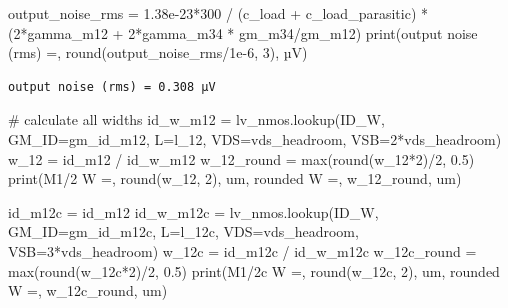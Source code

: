 \documentclass[
  a4paper,
  DIV=11,
  numbers=noendperiod]{scrartcl}
\newenvironment{Shaded}{\begin{snugshade}}{\end{snugshade}}
\newcommand{\BuiltInTok}[1]{\textcolor[rgb]{0.00,0.23,0.31}{#1}}
\newcommand{\CommentTok}[1]{\textcolor[rgb]{0.37,0.37,0.37}{#1}}
\newcommand{\DecValTok}[1]{\textcolor[rgb]{0.68,0.00,0.00}{#1}}
\newcommand{\FloatTok}[1]{\textcolor[rgb]{0.68,0.00,0.00}{#1}}
\newcommand{\NormalTok}[1]{\textcolor[rgb]{0.00,0.23,0.31}{#1}}
\newcommand{\OperatorTok}[1]{\textcolor[rgb]{0.37,0.37,0.37}{#1}}
\newcommand{\StringTok}[1]{\textcolor[rgb]{0.13,0.47,0.30}{#1}}
\begin{document}
\begin{tcolorbox}
\begin{Shaded}
\begin{Highlighting}[]
\NormalTok{output\_noise\_rms }\OperatorTok{=} \FloatTok{1.38e{-}23}\OperatorTok{*}\DecValTok{300} \OperatorTok{/}\NormalTok{ (c\_load }\OperatorTok{+}\NormalTok{ c\_load\_parasitic) }\OperatorTok{*}\NormalTok{ (}\DecValTok{2}\OperatorTok{*}\NormalTok{gamma\_m12 }\OperatorTok{+} \DecValTok{2}\OperatorTok{*}\NormalTok{gamma\_m34 }\OperatorTok{*}\NormalTok{ gm\_m34}\OperatorTok{/}\NormalTok{gm\_m12)}
\BuiltInTok{print}\NormalTok{(}\StringTok{\textquotesingle{}output noise (rms) =\textquotesingle{}}\NormalTok{, }\BuiltInTok{round}\NormalTok{(output\_noise\_rms}\OperatorTok{/}\FloatTok{1e{-}6}\NormalTok{, }\DecValTok{3}\NormalTok{), }\StringTok{\textquotesingle{}µV\textquotesingle{}}\NormalTok{)}
\end{Highlighting}
\end{Shaded}

\begin{verbatim}
output noise (rms) = 0.308 µV
\end{verbatim}

\begin{Shaded}
\begin{Highlighting}[]
\CommentTok{\# calculate all widths}
\NormalTok{id\_w\_m12 }\OperatorTok{=}\NormalTok{ lv\_nmos.lookup(}\StringTok{\textquotesingle{}ID\_W\textquotesingle{}}\NormalTok{, GM\_ID}\OperatorTok{=}\NormalTok{gm\_id\_m12, L}\OperatorTok{=}\NormalTok{l\_12, VDS}\OperatorTok{=}\NormalTok{vds\_headroom, VSB}\OperatorTok{=}\DecValTok{2}\OperatorTok{*}\NormalTok{vds\_headroom)}
\NormalTok{w\_12 }\OperatorTok{=}\NormalTok{ id\_m12 }\OperatorTok{/}\NormalTok{ id\_w\_m12}
\NormalTok{w\_12\_round }\OperatorTok{=} \BuiltInTok{max}\NormalTok{(}\BuiltInTok{round}\NormalTok{(w\_12}\OperatorTok{*}\DecValTok{2}\NormalTok{)}\OperatorTok{/}\DecValTok{2}\NormalTok{, }\FloatTok{0.5}\NormalTok{)}
\BuiltInTok{print}\NormalTok{(}\StringTok{\textquotesingle{}M1/2  W =\textquotesingle{}}\NormalTok{, }\BuiltInTok{round}\NormalTok{(w\_12, }\DecValTok{2}\NormalTok{), }\StringTok{\textquotesingle{}um, rounded W =\textquotesingle{}}\NormalTok{, w\_12\_round, }\StringTok{\textquotesingle{}um\textquotesingle{}}\NormalTok{)}

\NormalTok{id\_m12c }\OperatorTok{=}\NormalTok{ id\_m12}
\NormalTok{id\_w\_m12c }\OperatorTok{=}\NormalTok{ lv\_nmos.lookup(}\StringTok{\textquotesingle{}ID\_W\textquotesingle{}}\NormalTok{, GM\_ID}\OperatorTok{=}\NormalTok{gm\_id\_m12c, L}\OperatorTok{=}\NormalTok{l\_12c, VDS}\OperatorTok{=}\NormalTok{vds\_headroom, VSB}\OperatorTok{=}\DecValTok{3}\OperatorTok{*}\NormalTok{vds\_headroom)}
\NormalTok{w\_12c }\OperatorTok{=}\NormalTok{ id\_m12c }\OperatorTok{/}\NormalTok{ id\_w\_m12c}
\NormalTok{w\_12c\_round }\OperatorTok{=} \BuiltInTok{max}\NormalTok{(}\BuiltInTok{round}\NormalTok{(w\_12c}\OperatorTok{*}\DecValTok{2}\NormalTok{)}\OperatorTok{/}\DecValTok{2}\NormalTok{, }\FloatTok{0.5}\NormalTok{)}
\BuiltInTok{print}\NormalTok{(}\StringTok{\textquotesingle{}M1/2c W =\textquotesingle{}}\NormalTok{, }\BuiltInTok{round}\NormalTok{(w\_12c, }\DecValTok{2}\NormalTok{), }\StringTok{\textquotesingle{}um, rounded W =\textquotesingle{}}\NormalTok{, w\_12c\_round, }\StringTok{\textquotesingle{}um\textquotesingle{}}\NormalTok{)}


\end{Highlighting}
\end{Shaded}
\end{tcolorbox}
\end{document}
